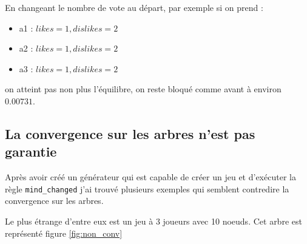 \documentclass[12pt]{article}
\theoremstyle{defi}
\theoremstyle{not}
\theoremstyle{prob}
\begin{document}
    En changeant le nombre de vote au départ, par exemple si on prend :
    \begin{itemize}
      \item a1 : $likes = 1, dislikes = 2$
      \item a2 : $likes = 1, dislikes = 2$
      \item a3 : $likes = 1, dislikes = 2$
    \end{itemize}

    on atteint pas non plus l'équilibre, on reste bloqué comme avant à environ $0.00731$.
\color{red}
    \subsection{La convergence sur les arbres n'est pas garantie}
      Après avoir créé un générateur qui est capable de créer un jeu et d'exécuter la règle \texttt{mind\_changed} j'ai trouvé plusieurs exemples qui semblent contredire la convergence sur les arbres.

      Le plus étrange d'entre eux est un jeu à 3 joueurs avec 10 noeuds. Cet arbre est représenté figure \ref{fig:non_conv}
\end{document}
